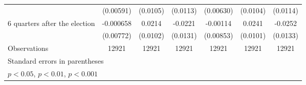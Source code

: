 \begin{table}[!ht]
\begin{tabular}{l*{6}{c}}
                    &   (0.00591)         &    (0.0105)         &    (0.0113)         &   (0.00630)         &    (0.0104)         &    (0.0114)         \\
[1em]
 6 quarters after the election&   -0.000658         &      0.0214\sym{*}  &     -0.0221         &    -0.00114         &      0.0241\sym{*}  &     -0.0252         \\
                    &   (0.00772)         &    (0.0102)         &    (0.0131)         &   (0.00853)         &    (0.0101)         &    (0.0133)         \\
\hline
Observations        &       12921         &       12921         &       12921         &       12921         &       12921         &       12921         \\
\hline\hline
\multicolumn{7}{l}{\footnotesize Standard errors in parentheses}\\
\multicolumn{7}{l}{\footnotesize \sym{*} \(p<0.05\), \sym{**} \(p<0.01\), \sym{***} \(p<0.001\)}\\
\end{tabular}
\end{table}
